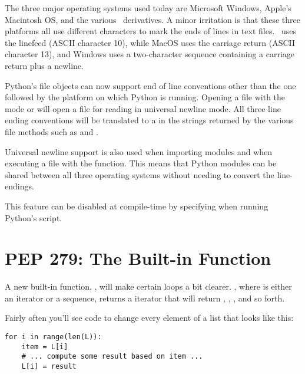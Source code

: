 \documentclass{howto}
\begin{document}
The three major operating systems used today are Microsoft Windows,
Apple's Macintosh OS, and the various \UNIX\ derivatives.  A minor
irritation is that these three platforms all use different characters
to mark the ends of lines in text files.  \UNIX\ uses the linefeed
(ASCII character 10), while MacOS uses the carriage return (ASCII
character 13), and Windows uses a two-character sequence containing a
carriage return plus a newline.

Python's file objects can now support end of line conventions other
than the one followed by the platform on which Python is running.
Opening a file with the mode  or  will open a file
for reading in universal newline mode.  All three line ending
conventions will be translated to a  in the strings
returned by the various file methods such as  and
.

Universal newline support is also used when importing modules and when
executing a file with the  function.  This means
that Python modules can be shared between all three operating systems
without needing to convert the line-endings.

This feature can be disabled at compile-time by specifying
 when running Python's
 script.

\begin{seealso}


\end{seealso}


\section{PEP 279: The  Built-in Function\label{section-enumerate}}

A new built-in function, , will make
certain loops a bit clearer.  , where
 is either an iterator or a sequence, returns a iterator
that will return , , , and so forth.  

Fairly often you'll see code to change every element of a list that
looks like this:

\begin{verbatim}
for i in range(len(L)):
    item = L[i]
    # ... compute some result based on item ...
    L[i] = result
\end{verbatim}
\end{document}
